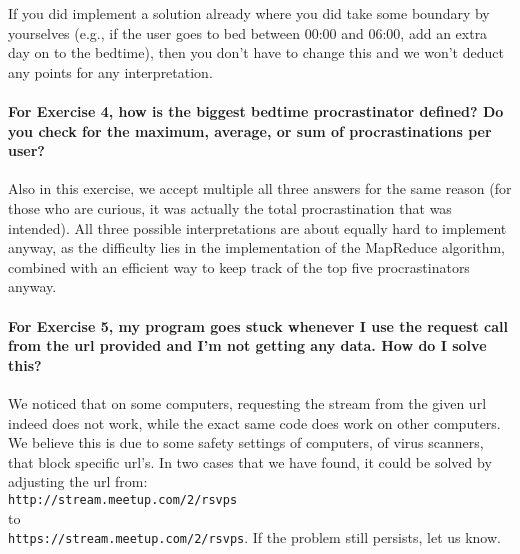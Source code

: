 \documentclass[a4paper]{report}
\theoremstyle{definition}
\begin{document}
If you did implement a solution already where you did take some boundary by yourselves (e.g., if the user goes to bed between 00:00 and 06:00, add an extra day on to the bedtime), then you don't have to change this and we won't deduct any points for any interpretation.

\paragraph{For Exercise 4, how is the biggest bedtime procrastinator defined? Do you check for the maximum, average, or sum of procrastinations per user?}
Also in this exercise, we accept multiple all three answers for the same reason (for those who are curious, it was actually the total procrastination that was intended). All three possible interpretations are about equally hard to implement anyway, as the difficulty lies in the implementation of the MapReduce algorithm, combined with an efficient way to keep track of the top five procrastinators anyway.

\paragraph{For Exercise 5, my program goes stuck whenever I use the request call from the url provided and I'm not getting any data. How do I solve this?}
We noticed that on some computers, requesting the stream from the given url indeed does not work, while the exact same code does work on other computers. We believe this is due to some safety settings of computers, of virus scanners, that block specific url's. In two cases that we have found, it could be solved by adjusting the url from:\\

\noindent \texttt{http://stream.meetup.com/2/rsvps}\\

\noindent to\\

\noindent \texttt{https://stream.meetup.com/2/rsvps}. If the problem still persists, let us know.
\end{document}
